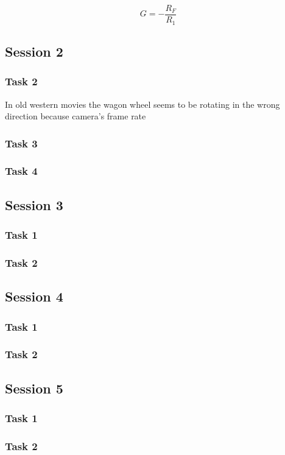 \documentclass[12pt]{article}
\begin{document}
\begin{equation}
G = -\frac{R_F}{R_1}
\label{eqn:G}
\end{equation}

\subsection{Session 2}

\subsubsection{Task 2}

In old western movies the wagon wheel seems to be rotating in the wrong direction because camera's frame rate 

\subsubsection{Task 3}

\subsubsection{Task 4}

\subsection{Session 3}

\subsubsection{Task 1}

\subsubsection{Task 2}

\subsection{Session 4}

\subsubsection{Task 1}

\subsubsection{Task 2}

\subsection{Session 5}

\subsubsection{Task 1}

\subsubsection{Task 2}
\end{document}
